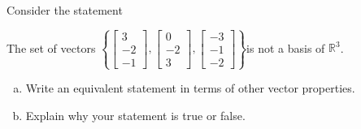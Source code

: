 
\begin{exerciseStatement}


Consider the statement 
\begin{center}\begin{minipage}{0.8\textwidth}
 The set of vectors \( \left\{ \left[\begin{array}{c}
3 \\
-2 \\
-1
\end{array}\right] , \left[\begin{array}{c}
0 \\
-2 \\
3
\end{array}\right] , \left[\begin{array}{c}
-3 \\
-1 \\
-2
\end{array}\right] \right\} \)is not a basis of \(\mathbb{R}^3\). 
\end{minipage}\end{center}
    


\begin{enumerate}[(a)]
\item  Write an equivalent statement in terms of other vector properties.
\item  Explain why your statement is true or false.
\end{enumerate}
    
\end{exerciseStatement}
    
